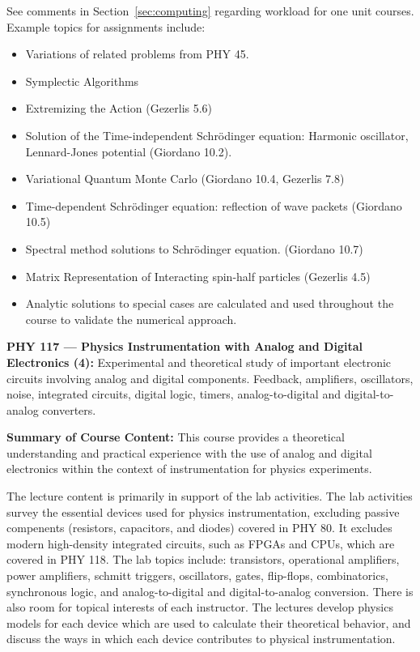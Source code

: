\documentclass[12pt]{article}
\begin{document}
See comments in Section~\ref{sec:computing} regarding workload for one
unit courses.  Example topics for assignments include:
\begin{itemize}
\item Variations of related problems from PHY 45.
\item Symplectic Algorithms
\item Extremizing the Action (Gezerlis 5.6)
\item Solution of the Time-independent Schr\"odinger equation: 
  Harmonic oscillator, Lennard-Jones potential (Giordano 10.2).
\item Variational Quantum Monte Carlo (Giordano 10.4, Gezerlis 7.8)
\item Time-dependent Schr\"odinger equation:  reflection of wave packets (Giordano 10.5)
\item Spectral method solutions to Schr\"odinger equation.  (Giordano 10.7)
\item Matrix Representation of Interacting spin-half particles (Gezerlis 4.5)
\item Analytic solutions to special cases are calculated and used throughout the course to validate the numerical approach.
\end{itemize}





\vskip 1cm
\noindent
{\bf PHY 117 --- Physics Instrumentation with Analog and Digital Electronics (4):}  
Experimental and theoretical study of important electronic circuits
involving analog and digital components.  Feedback, amplifiers,
oscillators, noise, integrated circuits, digital logic, timers,
analog-to-digital and digital-to-analog converters.


{\bf Summary of Course Content:}
This course provides a theoretical understanding and practical
experience with the use of analog and digital electronics within the
context of instrumentation for physics experiments.

The lecture content is primarily in support of the lab activities.
The lab activities survey the essential devices used for physics
instrumentation, excluding passive compenents (resistors, capacitors,
and diodes) covered in PHY 80.  It excludes modern high-density
integrated circuits, such as FPGAs and CPUs, which are covered in PHY
118.  The lab topics include: transistors, operational amplifiers,
power amplifiers, schmitt triggers, oscillators, gates, flip-flops,
combinatorics, synchronous logic, and analog-to-digital and
digital-to-analog conversion.  There is also room for topical
interests of each instructor.  The lectures develop physics models for
each device which are used to calculate their theoretical behavior,
and discuss the ways in which each device contributes to physical
instrumentation.
\end{document}
